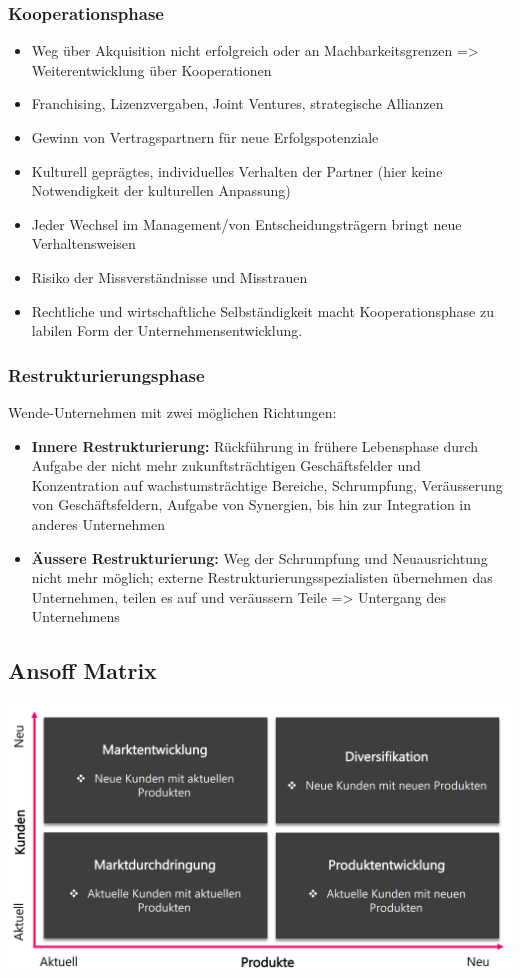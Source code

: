 \subsubsection{Kooperationsphase}
\begin{itemize}
	\item Weg über Akquisition nicht erfolgreich oder an Machbarkeitsgrenzen => Weiterentwicklung über Kooperationen
	\item Franchising, Lizenzvergaben, Joint Ventures, strategische Allianzen
	\item Gewinn von Vertragspartnern für neue Erfolgspotenziale
	\item Kulturell geprägtes, individuelles Verhalten der Partner (hier keine Notwendigkeit der kulturellen Anpassung)
	\item Jeder Wechsel im Management/von Entscheidungsträgern bringt neue Verhaltensweisen
	\item Risiko der Missverständnisse und Misstrauen
	\item Rechtliche und wirtschaftliche Selbständigkeit macht Kooperationsphase zu labilen Form der Unternehmensentwicklung.
\end{itemize}

\subsubsection{Restrukturierungsphase}
Wende-Unternehmen mit zwei möglichen Richtungen:
\begin{itemize}
	\item \textbf{Innere Restrukturierung:} Rückführung in frühere Lebensphase durch Aufgabe der nicht mehr zukunftsträchtigen Geschäftsfelder und Konzentration auf wachstumsträchtige Bereiche, Schrumpfung, Veräusserung von
	Geschäftsfeldern, Aufgabe von Synergien, bis hin zur Integration in anderes Unternehmen
	\item \textbf{Äussere Restrukturierung:} Weg der Schrumpfung und Neuausrichtung nicht mehr möglich; externe Restrukturierungsspezialisten übernehmen das Unternehmen, teilen es auf und veräussern Teile => Untergang des Unternehmens
\end{itemize}

\subsection{Ansoff Matrix}
\includegraphics[width=0.5\linewidth]{images/ansoff}